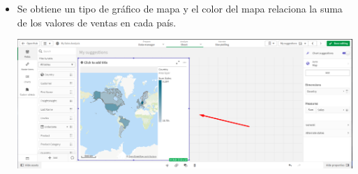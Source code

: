 \documentclass[12pt,letterpaper]{article}
\newcommand\tab[1][1cm]{\hspace*{#1}}
\begin{document}
\begin{enumerate}[\tab 1.]
\begin{center}
        \end{center}
        \begin{itemize}
            \item Se obtiene un tipo de gráfico de mapa y el color del mapa relaciona la suma de los valores de ventas en cada país.
            \begin{center}
                \includegraphics[width=13cm]{./img/img18.1.png}
            \end{center}
        \end{itemize}
    \end{enumerate}
    
\end{document}
